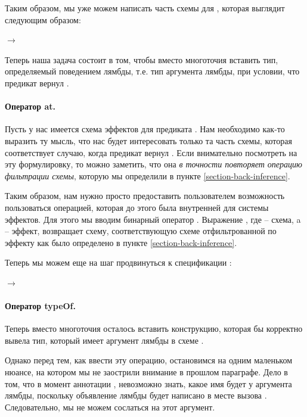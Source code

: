 Таким образом, мы уже можем написать часть схемы для , которая выглядит следующим образом:

{
   $\rightarrow$  \\
}{}

Теперь наша задача состоит в том, чтобы вместо многоточия вставить тип, определяемый поведением лямбды, т.е. тип аргумента лямбды, при условии, что предикат вернул .


\paragraph{Оператор at.}

Пусть у нас имеется схема эффектов для предиката . Нам необходимо как-то выразить ту мысль, что нас будет интересовать только та часть схемы, которая соответствует случаю, когда предикат вернул . Если внимательно посмотреть на эту формулировку, то можно заметить, что она  \emph{в точности повторяет операцию фильтрации схемы}, которую мы определили в пункте \ref{section-back-inference}.

Таким образом, нам нужно просто предоставить пользователем возможность пользоваться операцией, которая до этого была внутренней для системы эффектов. Для этого мы вводим бинарный оператор . Выражение , где  -- схема, a  -- эффект, возвращает схему, соответствующую схеме  отфильтрованной по эффекту  как было определено в пункте \ref{section-back-inference}.

Теперь мы можем еще на шаг продвинуться к спецификации :

{
   $\rightarrow$ 
}{}


\paragraph{Оператор typeOf.}

Теперь вместо многоточия осталось вставить конструкцию, которая бы корректно вывела тип, который имеет аргумент лямбды в схеме .

Однако перед тем, как ввести эту операцию, остановимся на одним маленьком нюансе, на котором мы не заострили внимание в прошлом параграфе. Дело в том, что в момент аннотации , невозможно знать, какое имя будет у аргумента лямбды, поскольку объявление лямбды будет написано в месте вызова . Следовательно, мы не можем сослаться на этот аргумент.

